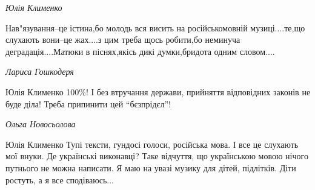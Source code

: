 \emph{Юлія Клименко}

Нав"язування--це істина,бо молодь вся висить на російськомовній музиці....те,що
слухають вони--це жах....з цим треба щось робити,бо неминуча
деградація....Матюки в піснях,якісь дикі думки,бридота одним словом....

\emph{Лариса Гошкодеря}

Юлія Клименко 100\%! І без втручання держави, прийняття відповідних законів не
буде діла! Треба припинити цей \enquote{бєзпрідєл}!

\emph{Ольга Новосьолова}

Юлія Клименко Тупі тексти, гундосі голоси, російська мова. І все це слухають
мої внуки. Де українські виконавці? Таке відчуття, що українською мовою нічого
путнього не можна написати. Я маю на увазі музику для дітей, підлітків. Діти
ростуть, а я все сподіваюсь...
